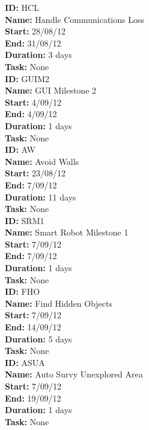 \documentclass[11pt, a4paper]{report}
\begin{document}
\noindent \textbf{ID:} HCL \\
\noindent \textbf{Name:} Handle Communications Loss \\
\noindent \textbf{Start:} 28/08/12 \\
\noindent \textbf{End:} 31/08/12 \\
\noindent \textbf{Duration:} 3 days \\
\noindent \textbf{Task:} None\\[0.5cm]

\noindent \textbf{ID:} GUIM2 \\
\noindent \textbf{Name:} GUI Milestone 2 \\
\noindent \textbf{Start:} 4/09/12 \\
\noindent \textbf{End:} 4/09/12 \\
\noindent \textbf{Duration:} 1 days \\
\noindent \textbf{Task:} None\\[0.5cm]

\noindent \textbf{ID:} AW \\
\noindent \textbf{Name:} Avoid Walls \\
\noindent \textbf{Start:} 23/08/12 \\
\noindent \textbf{End:} 7/09/12 \\
\noindent \textbf{Duration:} 11 days \\
\noindent \textbf{Task:} None\\[0.5cm]

\noindent \textbf{ID:} SRM1 \\
\noindent \textbf{Name:} Smart Robot Milestone 1 \\
\noindent \textbf{Start:} 7/09/12 \\
\noindent \textbf{End:} 7/09/12 \\
\noindent \textbf{Duration:} 1 days \\
\noindent \textbf{Task:} None\\[0.5cm]

\noindent \textbf{ID:} FHO \\
\noindent \textbf{Name:} Find Hidden Objects \\
\noindent \textbf{Start:} 7/09/12 \\
\noindent \textbf{End:} 14/09/12 \\
\noindent \textbf{Duration:} 5 days \\
\noindent \textbf{Task:} None\\[0.5cm]

\noindent \textbf{ID:} ASUA \\
\noindent \textbf{Name:} Auto Survy Unexplored Area \\
\noindent \textbf{Start:} 7/09/12 \\
\noindent \textbf{End:} 19/09/12 \\
\noindent \textbf{Duration:} 1 days \\
\noindent \textbf{Task:} None\\[0.5cm]
\end{document}

